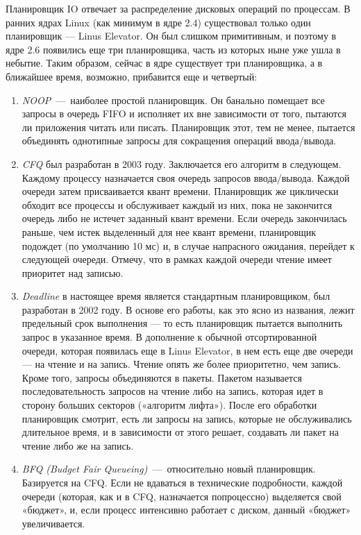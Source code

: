 \documentclass{article}
\begin{document}
Планировщик IO отвечает за распределение дисковых операций по процессам.  В ранних ядрах Linux (как минимум в ядре 2.4) существовал только один планировщик — Linus Elevator. Он был слишком примитивным, и поэтому в ядре 2.6 появились еще три планировщика, часть из которых ныне уже ушла в небытие. Таким образом, сейчас в ядре существует три планировщика, а в ближайшее время, возможно, прибавится еще и четвертый:
\begin{enumerate}
	\item \emph{NOOP}~---~наиболее простой планировщик. Он банально помещает все запросы в очередь FIFO и исполняет их вне зависимости от того, пытаются ли приложения читать или писать. Планировщик этот, тем не менее, пытается объединять однотипные запросы для сокращения операций ввода/вывода.
	\item \emph{CFQ} был разработан в 2003 году. Заключается его алгоритм в следующем. Каждому процессу назначается своя очередь запросов ввода/вывода. Каждой очереди затем присваивается квант времени. Планировщик же циклически обходит все процессы и обслуживает каждый из них, пока не закончится очередь либо не истечет заданный квант времени. Если очередь закончилась раньше, чем истек выделенный для нее квант времени, планировщик подождет (по умолчанию 10 мс) и, в случае напрасного ожидания, перейдет к следующей очереди. Отмечу, что в рамках каждой очереди чтение имеет приоритет над записью.
	\item \emph{Deadline} в настоящее время является стандартным планировщиком, был разработан в 2002 году. В основе его работы, как это ясно из названия, лежит предельный срок выполнения — то есть планировщик пытается выполнить запрос в указанное время. В дополнение к обычной отсортированной очереди, которая появилась еще в Linus Elevator, в нем есть еще две очереди — на чтение и на запись. Чтение опять же более приоритетно, чем запись. Кроме того, запросы объединяются в пакеты. Пакетом называется последовательность запросов на чтение либо на запись, которая идет в сторону больших секторов («алгоритм лифта»). После его обработки планировщик смотрит, есть ли запросы на запись, которые не обслуживались длительное время, и в зависимости от этого решает, создавать ли пакет на чтение либо же на запись.
	\item \emph{BFQ (Budget Fair Queueing)}~---~относительно новый планировщик. Базируется на CFQ. Если не вдаваться в технические подробности, каждой очереди (которая, как и в CFQ, назначается попроцессно) выделяется свой «бюджет», и, если процесс интенсивно работает с диском, данный «бюджет» увеличивается.
\end{enumerate}
\end{document}

